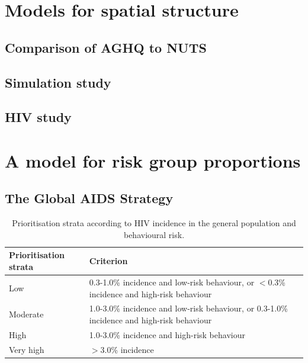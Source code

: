 \documentclass[a4paper, nobind]{templates/ociamthesis}
\begin{document}
\startappendices

\hypertarget{models-for-spatial-structure}{%
\chapter{Models for spatial structure}\label{models-for-spatial-structure}}

\hypertarget{comparison-of-aghq-to-nuts}{%
\section{Comparison of AGHQ to NUTS}\label{comparison-of-aghq-to-nuts}}

\hypertarget{simulation-study-1}{%
\section{Simulation study}\label{simulation-study-1}}

\hypertarget{hiv-study}{%
\section{HIV study}\label{hiv-study}}

\hypertarget{a-model-for-risk-group-proportions}{%
\chapter{A model for risk group proportions}\label{a-model-for-risk-group-proportions}}

\hypertarget{the-global-aids-strategy}{%
\section{The Global AIDS Strategy}\label{the-global-aids-strategy}}

\begin{table}[h]
\centering
\begin{tabularx}{\textwidth}{lX}
\toprule
Prioritisation strata & Criterion  \\
\midrule
Low & 0.3-1.0\% incidence and low-risk behaviour, or $<$0.3\% incidence and high-risk behaviour \\
Moderate & 1.0-3.0\% incidence and low-risk behaviour, or 0.3-1.0\% incidence and high-risk behaviour \\
High & 1.0-3.0\% incidence and high-risk behaviour \\
Very high & $>$3.0\% incidence \\
\bottomrule
\end{tabularx}
\caption{Prioritisation strata according to HIV incidence in the general population and behavioural risk.}
\label{tab:unaids-strategy-prioritisation}
\end{table}
\end{document}
